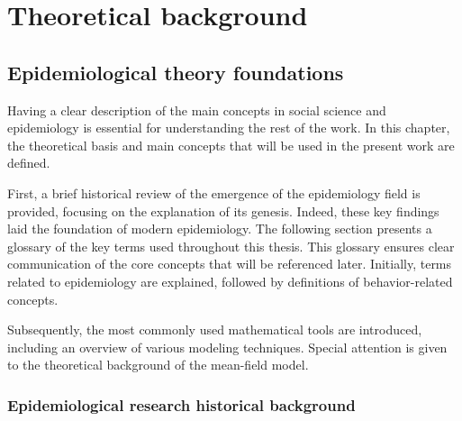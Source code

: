 \chapter{Theoretical background}
\label{ch:theo_back}
\section{Epidemiological theory foundations}

Having a clear description of the main concepts in social science and epidemiology is essential for understanding the rest of the work. In this chapter, the theoretical basis and main concepts that will be used in the present work are defined. 

First, a brief historical review of the emergence of the epidemiology field is provided, focusing on the explanation of its genesis. Indeed, these key findings laid the foundation of modern  epidemiology. 
The following section presents a glossary of the key terms used throughout this thesis. This glossary ensures clear communication of the core concepts that will be referenced later. Initially, terms related to epidemiology are explained, followed by definitions of behavior-related concepts.

Subsequently, the most commonly used mathematical tools are introduced, including an overview of various modeling techniques. Special attention is given to the theoretical background of the mean-field model.

\subsection{Epidemiological research historical background}
\label{subsec:history}

